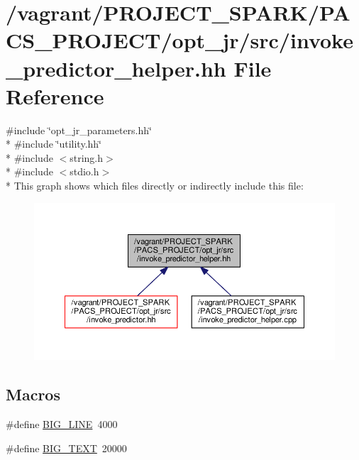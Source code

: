 \hypertarget{invoke__predictor__helper_8hh}{\section{/vagrant/\-P\-R\-O\-J\-E\-C\-T\-\_\-\-S\-P\-A\-R\-K/\-P\-A\-C\-S\-\_\-\-P\-R\-O\-J\-E\-C\-T/opt\-\_\-jr/src/invoke\-\_\-predictor\-\_\-helper.hh File Reference}
\label{invoke__predictor__helper_8hh}
}
{\ttfamily \#include \char`\"{}opt\-\_\-jr\-\_\-parameters.\-hh\char`\"{}}\\*
{\ttfamily \#include \char`\"{}utility.\-hh\char`\"{}}\\*
{\ttfamily \#include $<$string.\-h$>$}\\*
{\ttfamily \#include $<$stdio.\-h$>$}\\*
This graph shows which files directly or indirectly include this file\-:
\nopagebreak
\begin{figure}[H]
\begin{center}
\leavevmode
\includegraphics[width=350pt]{invoke__predictor__helper_8hh__dep__incl}
\end{center}
\end{figure}
\subsection*{Macros}
\begin{DoxyCompactItemize}
\item 
\#define \hyperlink{invoke__predictor__helper_8hh_adf5fb2a227e3abadea9424e33cc02705}{B\-I\-G\-\_\-\-L\-I\-N\-E}~4000
\item 
\#define \hyperlink{invoke__predictor__helper_8hh_af5bc9b073dea33e26386656ad6be5ef7}{B\-I\-G\-\_\-\-T\-E\-X\-T}~20000
\end{DoxyCompactItemize}
